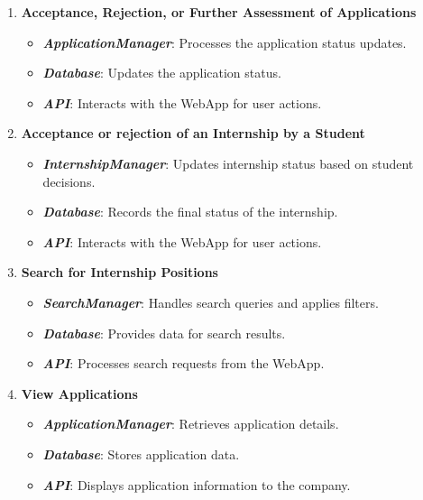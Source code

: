 \begin{enumerate}
        \item \textbf{Acceptance, Rejection, or Further Assessment of Applications}
        \begin{itemize}
            \item \textit{\textbf{ApplicationManager}}: Processes the application status updates.
            \item \textit{\textbf{Database}}: Updates the application status.
            \item \textit{\textbf{API}}: Interacts with the WebApp for user actions.
        \end{itemize}
        
        \item \textbf{Acceptance or rejection of an Internship by a Student}
        \begin{itemize}
            \item \textit{\textbf{InternshipManager}}: Updates internship status based on student decisions.
            \item \textit{\textbf{Database}}: Records the final status of the internship.
            \item \textit{\textbf{API}}: Interacts with the WebApp for user actions.
        \end{itemize}

        \item \textbf{Search for Internship Positions}
        \begin{itemize}
            \item \textit{\textbf{SearchManager}}: Handles search queries and applies filters.
            \item \textit{\textbf{Database}}: Provides data for search results.
            \item \textit{\textbf{API}}: Processes search requests from the WebApp.
        \end{itemize}

        \item \textbf{View Applications}
        \begin{itemize}
            \item \textit{\textbf{ApplicationManager}}: Retrieves application details.
            \item \textit{\textbf{Database}}: Stores application data.
            \item \textit{\textbf{API}}: Displays application information to the company.
        \end{itemize}


\end{enumerate}
